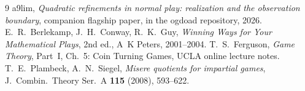 \documentclass[11pt]{article}
\theoremstyle{definition}
\theoremstyle{remark}
\begin{document}
\begin{thebibliography}{9}\footnotesize
{} a9lim, \emph{Quadratic refinements in normal play:
realization and the observation boundary}, companion flagship paper,
 in the ogdoad repository, 2026.
 E.~R.~Berlekamp, J.~H.~Conway, R.~K.~Guy, \emph{Winning Ways
for Your Mathematical Plays}, 2nd ed., A~K Peters, 2001--2004.
 T.~S.~Ferguson, \emph{Game Theory}, Part~I,
Ch.~5: Coin Turning Games, UCLA online lecture notes.
 T.~E.~Plambeck, A.~N.~Siegel, \emph{Misere quotients for
impartial games}, J.\ Combin.\ Theory Ser.\ A \textbf{115} (2008),
593--622.
\end{thebibliography}
\end{document}
